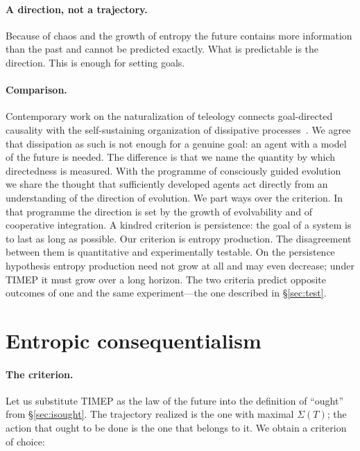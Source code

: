 \documentclass[11pt,a4paper]{article}
\newcommand{\Sref}[1]{\hyperref[#1]{\S\ref{#1}}}
\begin{document}
\paragraph{A direction, not a trajectory.}
Because of chaos and the growth of entropy the future contains more information than the past and cannot be predicted exactly. What is predictable is the direction. This is enough for setting goals.

\paragraph{Comparison.}
Contemporary work on the naturalization of teleology connects goal-directed causality with the self-sustaining organization of dissipative processes~\cite{deacon2023,valdecasas2022}. We agree that dissipation as such is not enough for a genuine goal: an agent with a model of the future is needed. The difference is that we name the quantity by which directedness is measured. With the programme of consciously guided evolution~\cite{stewart2026} we share the thought that sufficiently developed agents act directly from an understanding of the direction of evolution. We part ways over the criterion. In that programme the direction is set by the growth of evolvability and of cooperative integration. A kindred criterion is persistence: the goal of a system is to last as long as possible. Our criterion is entropy production. The disagreement between them is quantitative and experimentally testable. On the persistence hypothesis entropy production need not grow at all and may even decrease; under TIMEP it must grow over a long horizon. The two criteria predict opposite outcomes of one and the same experiment---the one described in \Sref{sec:test}.

\section{Entropic consequentialism}\label{sec:ec}

\paragraph{The criterion.}
Let us substitute TIMEP as the law of the future into the definition of ``ought'' from \Sref{sec:isought}. The trajectory realized is the one with maximal $\Sigma(T)$; the action that ought to be done is the one that belongs to it. We obtain a criterion of choice:
\end{document}
